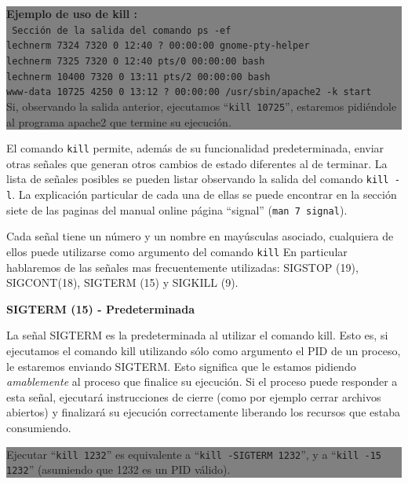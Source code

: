 \documentclass[12pt]{article}
\begin{document}
\colorbox{grey}{\parbox[t]{0.95\linewidth}{ \vspace*{0.5cm} { 
{\bf Ejemplo de uso de kill :} \\
{\tt
Sección de la salida del comando \texttt{ps -ef}\\
lechnerm  7324  7320  0 12:40 ?        00:00:00 gnome-pty-helper \\
lechnerm  7325  7320  0 12:40 pts/0    00:00:00 bash\\
lechnerm 10400  7320  0 13:11 pts/2    00:00:00 bash\\
www-data 10725  4250  0 13:12 ?        00:00:00 /usr/sbin/apache2 -k start \\
}
Si, observando la salida anterior, ejecutamos ``\texttt{kill 10725}'', 
estaremos pidiéndole al programa apache2 que termine su ejecución. 
} \vspace*{0.5cm} } } 
	
El comando \texttt{kill} permite, además de su funcionalidad predeterminada,
enviar otras señales que generan otros cambios de estado diferentes al de 
terminar. La lista de señales posibles se pueden listar observando la 
salida del comando \texttt{kill -l}. La explicación particular de cada 
una de ellas se puede encontrar en la sección siete de las paginas del 
manual online página ``signal'' (\texttt{man 7 signal}).  

Cada señal tiene un número y un nombre en mayúsculas asociado, cualquiera
de ellos puede utilizarse como argumento del comando \texttt{kill}  
En particular hablaremos de las señales mas frecuentemente utilizadas: 
SIGSTOP (19), SIGCONT(18), SIGTERM (15) y  SIGKILL (9).  

\textbf{SIGTERM (15) - Predeterminada}

La señal SIGTERM es la predeterminada al utilizar el comando kill. Esto 
es, si ejecutamos el comando kill utilizando sólo como argumento el PID 
de un proceso, le estaremos enviando SIGTERM. Esto significa que le estamos
pidiendo \textit{amablemente} al proceso que finalice su ejecución. 
Si el proceso puede responder a esta señal, ejecutará instrucciones de 
cierre (como por ejemplo cerrar archivos abiertos) y finalizará su 
ejecución correctamente liberando los recursos que estaba consumiendo. 

\colorbox{grey}{\parbox[t]{0.95\linewidth}{ \vspace*{0.5cm} { 
{\bf }
Ejecutar ``\texttt{kill 1232}'' es equivalente a ``\texttt{kill -SIGTERM 
1232}'', y a ``\texttt{kill -15 1232}'' (asumiendo que 1232 es un PID 
válido). 
} \vspace*{0.5cm} } } 
\end{document}
